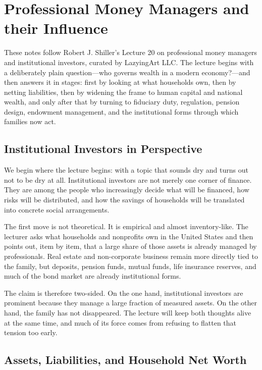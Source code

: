 \chapter{Professional Money Managers and their Influence}

These notes follow Robert J. Shiller's Lecture 20 on professional money managers and institutional investors, curated by LazyingArt LLC. The lecture begins with a deliberately plain question---who governs wealth in a modern economy?---and then answers it in stages: first by looking at what households own, then by netting liabilities, then by widening the frame to human capital and national wealth, and only after that by turning to fiduciary duty, regulation, pension design, endowment management, and the institutional forms through which families now act.

\section{Institutional Investors in Perspective}

We begin where the lecture begins: with a topic that sounds dry and turns out not to be dry at all. Institutional investors are not merely one corner of finance. They are among the people who increasingly decide what will be financed, how risks will be distributed, and how the savings of households will be translated into concrete social arrangements.

The first move is not theoretical. It is empirical and almost inventory-like. The lecturer asks what households and nonprofits own in the United States and then points out, item by item, that a large share of those assets is already managed by professionals. Real estate and non-corporate business remain more directly tied to the family, but deposits, pension funds, mutual funds, life insurance reserves, and much of the bond market are already institutional forms.

The claim is therefore two-sided. On the one hand, institutional investors are prominent because they manage a large fraction of measured assets. On the other hand, the family has not disappeared. The lecture will keep both thoughts alive at the same time, and much of its force comes from refusing to flatten that tension too early.

\section{Assets, Liabilities, and Household Net Worth}

